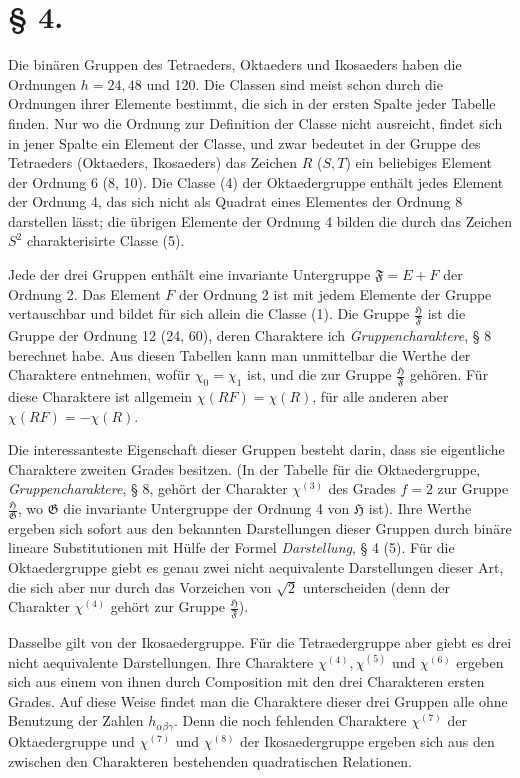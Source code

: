 \documentclass[11pt]{article}
\newcommand{\Hgr}{\mathfrak{H}}
\newcommand{\Ggr}{\mathfrak{G}}
\newcommand{\Fgr}{\mathfrak{F}}
\begin{document}
\section*{§ 4.}

Die binären Gruppen des Tetraeders, Oktaeders und Ikosaeders haben die Ordnungen $h=24,48$ und 120. Die Classen sind meist schon durch die Ordnungen ihrer Elemente bestimmt, die sich in der ersten Spalte jeder Tabelle finden. Nur wo die Ordnung zur Definition der Classe nicht ausreicht, findet sich in jener Spalte ein Element der Classe, und zwar bedeutet in der Gruppe des Tetraeders (Oktaeders, Ikosaeders) das Zeichen $R$ ($S,T$) ein beliebiges Element der Ordnung 6 (8, 10). Die Classe (4) der Oktaedergruppe enthält jedes Element der Ordnung 4, das sich nicht als Quadrat eines Elementes der Ordnung 8 darstellen lässt; die übrigen Elemente der Ordnung 4 bilden die durch das Zeichen $S^2$ charakterisirte Classe (5).

Jede der drei Gruppen enthält eine invariante Untergruppe $\Fgr=E+F$ der Ordnung 2. Das Element $F$ der Ordnung 2 ist mit jedem Elemente der Gruppe vertauschbar und bildet für sich allein die Classe (1). Die Gruppe $\frac{\Hgr}{\Fgr}$ ist die Gruppe der Ordnung 12 (24, 60), deren Charaktere ich \emph{Gruppencharaktere}, § 8 berechnet habe. Aus diesen Tabellen kann man unmittelbar die Werthe der Charaktere entnehmen, wofür $\chi_0=\chi_1$ ist, und die zur Gruppe $\frac{\Hgr}{\Fgr}$ gehören. Für diese Charaktere ist allgemein $\chi(RF)=\chi(R)$, für alle anderen aber $\chi(RF)=-\chi(R)$.

Die interessanteste Eigenschaft dieser Gruppen besteht darin, dass sie eigentliche Charaktere zweiten Grades besitzen. (In der Tabelle für die Oktaedergruppe, \emph{Gruppencharaktere}, § 8, gehört der Charakter $\chi^{(3)}$ des Grades $f=2$ zur Gruppe $\frac{\Hgr}{\Ggr}$, wo $\Ggr$ die invariante Untergruppe der Ordnung 4 von $\Hgr$ ist). Ihre Werthe ergeben sich sofort aus den bekannten Darstellungen dieser Gruppen durch binäre lineare Substitutionen mit Hülfe der Formel \emph{Darstellung}, § 4 (5). Für die Oktaedergruppe giebt es genau zwei nicht aequivalente Darstellungen dieser Art, die sich aber nur durch das Vorzeichen von $\sqrt2$ unterscheiden (denn der Charakter $\chi^{(4)}$ gehört zur Gruppe $\frac{\Hgr}{\Fgr}$).

Dasselbe gilt von der Ikosaedergruppe. Für die Tetraedergruppe aber giebt es drei nicht aequivalente Darstellungen. Ihre Charaktere $\chi^{(4)},\chi^{(5)}$ und $\chi^{(6)}$ ergeben sich aus einem von ihnen durch Composition mit den drei Charakteren ersten Grades. Auf diese Weise findet man die Charaktere dieser drei Gruppen alle ohne Benutzung der Zahlen $h_{\alpha\beta\gamma}$. Denn die noch fehlenden Charaktere $\chi^{(7)}$ der Oktaedergruppe und $\chi^{(7)}$ und $\chi^{(8)}$ der Ikosaedergruppe ergeben sich aus den zwischen den Charakteren bestehenden quadratischen Relationen.
\end{document}
